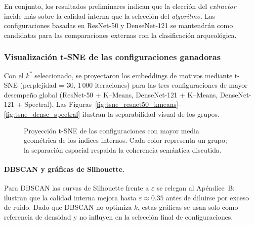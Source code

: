En conjunto, los resultados preliminares indican que la elección del \emph{extractor} incide más sobre la calidad interna que la selección del \emph{algoritmo}.
Las configuraciones basadas en ResNet-50 y DenseNet-121 se mantendrán como candidatas para las comparaciones externas con la clasificación arqueológica.

\subsubsection{Visualización t-SNE de las configuraciones ganadoras}

Con el $k^\ast$ seleccionado, se proyectaron los embeddings de motivos
mediante t-SNE (perplejidad = 30, 1\,000 iteraciones) para las tres
configuraciones de mayor desempeño global
(ResNet-50 + K–Means, DenseNet-121 + K–Means, DenseNet-121 + Spectral).
Las Figuras~\ref{fig:tsne_resnet50_kmeans}–\ref{fig:tsne_dense_spectral}
ilustran la separabilidad visual de los grupos.

\begin{figure}[!h]
  \centering
  \hfill
  \hfill

  \caption{Proyección t-SNE de las configuraciones con mayor media
    geométrica de los índices internos. Cada color representa un grupo;
    la separación espacial respalda la coherencia semántica discutida.}%
  \label{fig:tsne_best}
\end{figure}

\vspace{1ex}
\paragraph{DBSCAN y gráficas de Silhouette.}
Para DBSCAN las curvas de Silhouette frente a \(\varepsilon\) se relegan al
Apéndice~B: ilustran que la calidad interna mejora hasta
\(\varepsilon\approx0.35\) antes de diluirse por exceso de ruido.
Dado que DBSCAN no optimiza $k$, estas gráficas se usan solo como referencia
de densidad y no influyen en la selección final de configuraciones.

